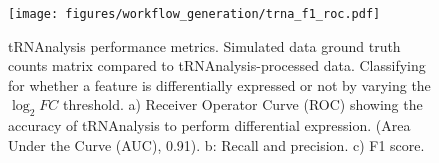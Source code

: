 \begin{figure}[htb]
\centering
\texttt{[image: figures/workflow\_generation/trna\_f1\_roc.pdf]}
\caption[tRNAnalysis performance metrics]{tRNAnalysis performance metrics.
Simulated data ground truth counts matrix compared to tRNAnalysis-processed data.
Classifying for whether a feature is differentially expressed or not by varying the $\log_{2}FC$ threshold.
a) Receiver Operator Curve (ROC) showing the accuracy of tRNAnalysis to perform differential expression. (Area Under the Curve (AUC), 0.91).
b: Recall and precision.
c) F1 score.}
\label{fig:trna_f1_roc}
\end{figure}
